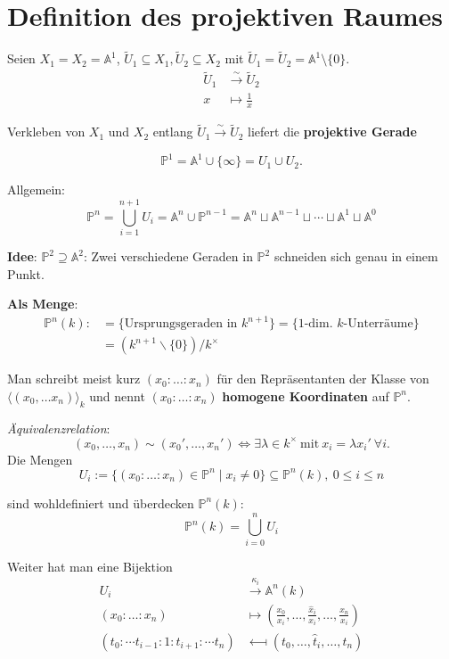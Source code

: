 
\section{Definition des projektiven Raumes}
\label{sec:def-projektiver-raum}

Seien $X_{1}=X_{2}=\mathbb{A}^{1}$, $\tilde{U}_{1}\subseteq X_{1}, \tilde{U}_{2}\subseteq X_{2}$ mit $\tilde{U}_{1} = \tilde{U}_{2} = \mathbb{A}^{1}\setminus\{0\}$.
\begin{align*}
  \tilde{U}_{1} & \overset{\sim}{\longrightarrow}\tilde{U}_{2}\\
  x & \longmapsto\frac{1}{x}
\end{align*}

Verkleben von $X_{1}$ und $X_{2}$ entlang $\tilde{U}_{1} \overset{\sim}\longrightarrow \tilde{U}_{2}$ liefert die \textbf{projektive Gerade}

\[
  \mathbb{P}^{1}=\mathbb{A}^{1}\cup\{\infty\}=U_{1}\cup U_{2}.
\]

Allgemein: 
\[
  \mathbb{P}^{n}=\bigcup_{i=1}^{n+1}U_{i}=\mathbb{A}^{n}\cup\mathbb{P}^{n-1}=\mathbb{A}^{n}\sqcup\mathbb{A}^{n-1}\sqcup\cdots\sqcup\mathbb{A}^{1}\sqcup\mathbb{A}^{0}
\]

\textbf{Idee}: $\mathbb{P}^{2}\supseteq\mathbb{A}^{2}$: Zwei verschiedene
Geraden in $\mathbb{P}^{2}$ schneiden sich genau in einem Punkt.

\textbf{Als Menge}:
\begin{align*}
  \mathbb{P}^{n}(k): & =\{\text{Ursprungsgeraden in }k^{n+1}\}=\{1\text{-dim. }k\text{-Unterräume}\}\\
                     & =(k^{n+1}\backslash\{0\})/k^{\times}
\end{align*}

Man schreibt meist kurz $(x_{0}:\ldots:x_{n})$ für den Repräsentanten der Klasse von $\langle(x_{0},\ldots x_{n})\rangle_{k}$ und nennt $(x_{0}:\ldots:x_{n})$ \textbf{homogene Koordinaten} auf $\mathbb{P}^{n}$.


\emph{Äquivalenzrelation}: 
\[
  (x_{0},\ldots,x_{n})\sim(x_{0}',\ldots,x_{n}')\Leftrightarrow\exists\lambda\in k^{\times}\ \text{mit}\ x_{i}=\lambda x_{i}'\ \forall i.
\]
Die Mengen
\[
  U_{i}:=\{(x_{0}:\ldots:x_{n})\in\mathbb{P}^{n}\mid x_{i}\neq0\}\subseteq\mathbb{P}^{n}(k),\ 0\leq i\leq n
\]

sind wohldefiniert und überdecken $\mathbb{P}^{n}(k)$:
\[
  \mathbb{P}^{n}(k)=\bigcup_{i=0}^{n}U_{i}
\]

Weiter hat man eine Bijektion
\begin{align*}
  U_{i} & \overset{\kappa_{i}}{\longrightarrow}\mathbb{A}^{n}(k)\\
  (x_{0}:\ldots:x_{n}) & \longmapsto\left(\frac{x_{0}}{x_{i}},\ldots,\frac{\hat{x}_{i}}{x_{i}},\ldots,\frac{x_{n}}{x_{i}}\right)\\
  (t_{0}:\cdots t_{i-1}:1:t_{i+1}:\cdots t_{n}) & \longmapsfrom(t_{0},\ldots,\hat{t}_{i},\ldots,t_{n})
\end{align*}

